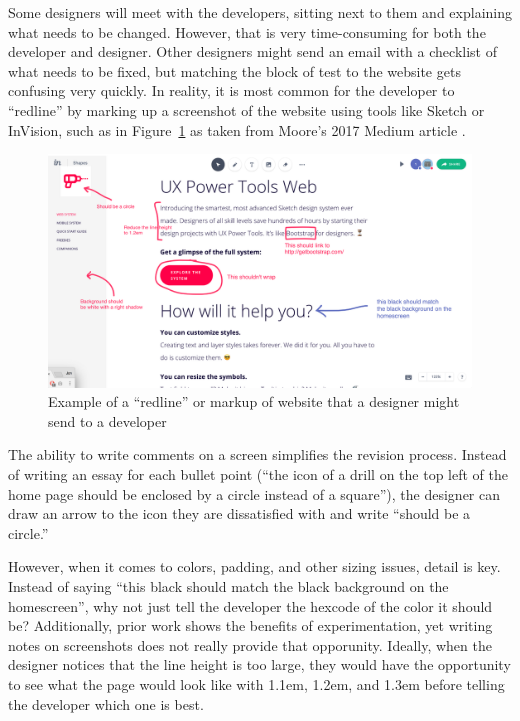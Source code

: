 \documentclass{sigchi}
\begin{document}
Some designers will meet with the developers, sitting next to them and explaining what needs to be changed. However, that is very time-consuming for both the developer and designer. Other designers might send an email with a checklist of what needs to be fixed, but matching the block of test to the website gets confusing very quickly. In reality, it is most common for the developer to ``redline'' by marking up a screenshot of the website using tools like Sketch or InVision, such as in Figure~\ref{fig:markup_redline_website} as taken from Moore's 2017 Medium article \cite{digital_whiteboards_moore_medium_2017}. 

\begin{figure}
    \centering
    \includegraphics[width=\columnwidth]{figures/screenshot_redline_found_google.png}
    \caption{Example of a ``redline'' or markup of website that a designer might send to a developer}
    \label{fig:markup_redline_website}
\end{figure}

The ability to write comments on a screen simplifies the revision process. Instead of writing an essay for each bullet point (``the icon of a drill on the top left of the home page should be enclosed by a circle instead of a square''), the designer can draw an arrow to the icon they are dissatisfied with and write ``should be a circle.'' 

However, when it comes to colors, padding, and other sizing issues, detail is key. Instead of saying ``this black should match the black background on the homescreen'', why not just tell the developer the hexcode of the color it should be? Additionally, prior work shows the benefits of experimentation, yet writing notes on screenshots does not really provide that opporunity. Ideally, when the designer notices that the line height is too large, they would have the opportunity to see what the page would look like with 1.1em, 1.2em, and 1.3em before telling the developer which one is best. 
\end{document}
